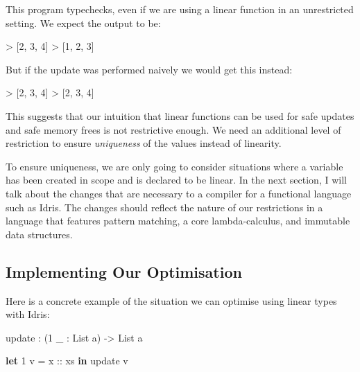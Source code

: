 \documentclass[
]{article}
\newenvironment{Shaded}{}{}
\newcommand{\DataTypeTok}[1]{\textcolor[rgb]{0.56,0.13,0.00}{#1}}
\newcommand{\DecValTok}[1]{\textcolor[rgb]{0.25,0.63,0.44}{#1}}
\newcommand{\KeywordTok}[1]{\textcolor[rgb]{0.00,0.44,0.13}{\textbf{#1}}}
\newcommand{\NormalTok}[1]{#1}
\newcommand{\OperatorTok}[1]{\textcolor[rgb]{0.40,0.40,0.40}{#1}}
\newcommand{\OtherTok}[1]{\textcolor[rgb]{0.00,0.44,0.13}{#1}}
\begin{document}
This program typechecks, even if we are using a linear function in an
unrestricted setting. We expect the output to be:

\begin{Shaded}
\begin{Highlighting}[]
\OperatorTok{\textgreater{}}\NormalTok{ [}\DecValTok{2}\NormalTok{, }\DecValTok{3}\NormalTok{, }\DecValTok{4}\NormalTok{]}
\OperatorTok{\textgreater{}}\NormalTok{ [}\DecValTok{1}\NormalTok{, }\DecValTok{2}\NormalTok{, }\DecValTok{3}\NormalTok{]}
\end{Highlighting}
\end{Shaded}

But if the update was performed naively we would get this instead:

\begin{Shaded}
\begin{Highlighting}[]
\OperatorTok{\textgreater{}}\NormalTok{ [}\DecValTok{2}\NormalTok{, }\DecValTok{3}\NormalTok{, }\DecValTok{4}\NormalTok{]}
\OperatorTok{\textgreater{}}\NormalTok{ [}\DecValTok{2}\NormalTok{, }\DecValTok{3}\NormalTok{, }\DecValTok{4}\NormalTok{]}
\end{Highlighting}
\end{Shaded}

This suggests that our intuition that linear functions can be used for
safe updates and safe memory frees is not restrictive enough. We need an
additional level of restriction to ensure \emph{uniqueness} of the
values instead of linearity.

To ensure uniqueness, we are only going to consider situations where a
variable has been created in scope and is declared to be linear. In the
next section, I will talk about the changes that are necessary to a
compiler for a functional language such as Idris. The changes should
reflect the nature of our restrictions in a language that features
pattern matching, a core lambda-calculus, and immutable data structures.

\hypertarget{implementing-our-optimisation}{%
\subsection{Implementing Our
Optimisation}\label{implementing-our-optimisation}}

\label{subsec:implementing-optimisation}

Here is a concrete example of the situation we can optimise using linear
types with Idris:

\begin{Shaded}
\begin{Highlighting}[]
\NormalTok{update }\OperatorTok{:}\NormalTok{ (}\DecValTok{1}\NormalTok{ \_ }\OperatorTok{:} \DataTypeTok{List}\NormalTok{ a) }\OtherTok{{-}\textgreater{}} \DataTypeTok{List}\NormalTok{ a}

\KeywordTok{let} \DecValTok{1}\NormalTok{ v }\OtherTok{= x ::}\NormalTok{ xs }\KeywordTok{in}
\NormalTok{    update v}
\end{Highlighting}
\end{Shaded}
\end{document}

